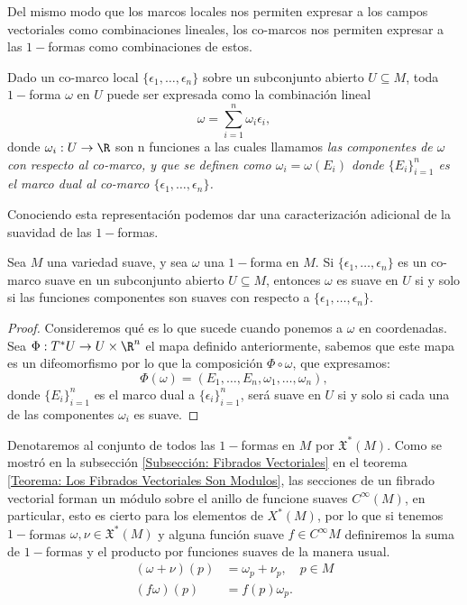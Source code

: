 Del mismo modo que los marcos locales nos permiten expresar a los campos vectoriales como combinaciones lineales, los co-marcos nos permiten expresar a las $1-$formas como combinaciones de estos.

Dado un co-marco local $\{\epsilon_1,\ldots,\epsilon_n\}$ sobre un subconjunto abierto $U \subseteq M$, toda $1-$forma $\omega$ en $U$ puede ser expresada como la combinación lineal
\[
	\omega = \sum_{i=1}^{n} \omega_i \epsilon_i,
\]
donde $\omega_i: U \to \R$ son n funciones a las cuales llamamos \it{las componentes de $\omega$ con respecto al co-marco}, y que se definen como $\omega_i = \omega(E_i)$ donde $\{E_i\}_{i=1}^n$ es el marco dual al co-marco $\{\epsilon_1,\ldots,\epsilon_n\}$.

Conociendo esta representación podemos dar una caracterización adicional de la suavidad de las $1-$formas.

\begin{theorem}
	Sea $M$ una variedad suave, y sea $\omega$ una $1-$forma en $M$. Si $\{\epsilon_1,\ldots,\epsilon_n\}$ es un co-marco suave en un subconjunto abierto $U \subseteq M$, entonces $\omega$ es suave en $U$ si y solo si las funciones componentes son suaves con respecto a $\{\epsilon_1, \ldots, \epsilon_n\}$.
\end{theorem}

\begin{proof}
	Consideremos qué es lo que sucede cuando ponemos a $\omega$ en coordenadas. Sea $\Phi: T^{*}U \to U \times \R^n$ el mapa definido anteriormente, sabemos que este mapa es un difeomorfismo por lo que la composición $\Phi \circ \omega$, que expresamos:
	\[
		\Phi(\omega) = (E_1, \ldots, E_n, \omega_1, \ldots, \omega_n),
	\]
	donde $\{E_i\}_{i=1}^n$ es el marco dual a $\{\epsilon_i\}_{i=1}^n$, será suave en $U$ si y solo si cada una de las componentes $\omega_i$ es suave.
\end{proof}

Denotaremos al conjunto de todos las $1-$formas en $M$ por $\mathfrak{X}^*(M)$. Como se mostró en la subsección \ref{Subsección: Fibrados Vectoriales} en el teorema \ref{Teorema: Los Fibrados Vectoriales Son Modulos}, las secciones de un fibrado vectorial forman un módulo sobre el anillo de funcione suaves $C^{\infty}(M)$, en particular, esto es cierto para los elementos de $X^{*}(M)$, por lo que si tenemos $1-$formas $\omega,\nu \in \mathfrak{X}^*(M)$ y alguna función suave $f \in C^{\infty}M$ definiremos la suma de $1-$formas y el producto por funciones suaves de la manera usual.
\begin{align*}
	(\omega + \nu)(p) & = \omega_p + \nu_p, \quad p \in M \\
	(f\omega)(p)      & = f(p)\omega_p.
\end{align*}
